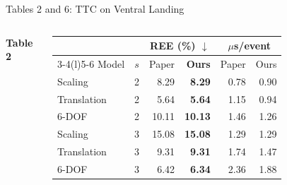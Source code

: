 \documentclass[aspectratio=169,10pt]{beamer}
\newcommand{\G}{\cellcolor{good}}
\newcommand{\us}{\,$\mu$s}
\begin{document}
\begin{frame}{Tables 2 and 6: TTC on Ventral Landing}
  \begin{columns}[T,onlytextwidth]
    {\color{titlebar}\bfseries Table 2}\par\vspace{1mm}
    \footnotesize\setlength{\tabcolsep}{4pt}
    \begin{tabular}{@{}l c r r r r@{}}
      \toprule
      & & \multicolumn{2}{c}{REE (\%) $\downarrow$} & \multicolumn{2}{c}{\us/event} \\
      \cmidrule(lr){3-4}\cmidrule(l){5-6}
      Model & $s$ & Paper & \textbf{Ours} & Paper & Ours \\
      \midrule
      Scaling     & 2 & 8.29  & \G\textbf{8.29}  & 0.78 & 0.90 \\
      Translation & 2 & 5.64  & \G\textbf{5.64}  & 1.15 & 0.94 \\
      6-DOF       & 2 & 10.11 & \G\textbf{10.13} & 1.46 & 1.26 \\
      Scaling     & 3 & 15.08 & \G\textbf{15.08} & 1.29 & 1.29 \\
      Translation & 3 & 9.31  & \G\textbf{9.31}  & 1.74 & 1.47 \\
      6-DOF       & 3 & 6.42  & \G\textbf{6.34}  & 2.36 & 1.88 \\
      \bottomrule
    \end{tabular}


\end{columns}
\end{frame}
\end{document}
